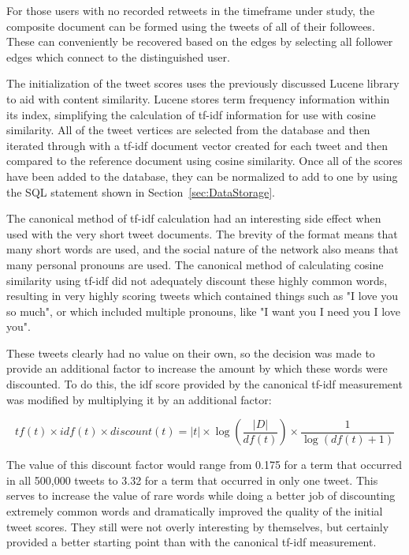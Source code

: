 For those users with no recorded retweets in the timeframe under study, the composite document can be formed using the tweets of all of their followees. These can conveniently be recovered based on the edges by selecting all follower edges which connect to the distinguished user.

The initialization of the tweet scores uses the previously discussed Lucene library to aid with content similarity. Lucene stores term frequency information within its index, simplifying the calculation of tf-idf information for use with cosine similarity. All of the tweet vertices are selected from the database and then iterated through with a tf-idf document vector created for each tweet and then compared to the reference document using cosine similarity. Once all of the scores have been added to the database, they can be normalized to add to one by using the SQL statement shown in Section~\ref{sec:DataStorage}.

The canonical method of tf-idf calculation had an interesting side effect when used with the very short tweet documents. The brevity of the format means that many short words are used, and the social nature of the network also means that many personal pronouns are used. The canonical method of calculating cosine similarity using tf-idf did not adequately discount these highly common words, resulting in very highly scoring tweets which contained things such as "I love you so much", or which included multiple pronouns, like "I want you I need you I love you".

These tweets clearly had no value on their own, so the decision was made to provide an additional factor to increase the amount by which these words were discounted. To do this, the idf score provided by the canonical tf-idf measurement was modified by multiplying it by an additional factor:

\begin{center}
\[
tf(t) \times idf(t) \times discount(t) = |t| \times \log(\frac{|D|}{df(t)}) \times \frac{1}{\log(df(t) + 1)}
\]
\end{center}

The value of this discount factor would range from 0.175 for a term that occurred in all 500,000 tweets to 3.32 for a term that occurred in only one tweet. This serves to increase the value of rare words while doing a better job of discounting extremely common words and dramatically improved the quality of the initial tweet scores. They still were not overly interesting by themselves, but certainly provided a better starting point than with the canonical tf-idf measurement.



